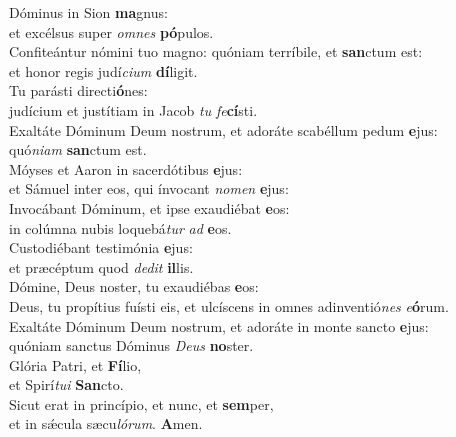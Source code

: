 \evenverse Dóminus in Sion \textbf{ma}gnus:~\*\\
\evenverse et excélsus super \textit{om}\textit{nes} \textbf{pó}pulos.\\
\oddverse Confiteántur nómini tuo magno: quóniam terríbile, et \textbf{san}ctum est:~\*\\
\oddverse et honor regis judí\textit{ci}\textit{um} \textbf{dí}ligit.\\
\evenverse Tu parásti directi\textbf{ó}nes:~\*\\
\evenverse judícium et justítiam in Jacob \textit{tu} \textit{fe}\textbf{cí}sti.\\
\oddverse Exaltáte Dóminum Deum nostrum, et adoráte scabéllum pedum \textbf{e}jus:~\*\\
\oddverse quó\textit{ni}\textit{am} \textbf{san}ctum est.\\
\evenverse Móyses et Aaron in sacerdótibus \textbf{e}jus:~\*\\
\evenverse et Sámuel inter eos, qui ínvocant \textit{no}\textit{men} \textbf{e}jus:\\
\oddverse Invocábant Dóminum, et ipse exaudiébat \textbf{e}os:~\*\\
\oddverse in colúmna nubis loquebá\textit{tur} \textit{ad} \textbf{e}os.\\
\evenverse Custodiébant testimónia \textbf{e}jus:~\*\\
\evenverse et præcéptum quod \textit{de}\textit{dit} \textbf{il}lis.\\
\oddverse Dómine, Deus noster, tu exaudiébas \textbf{e}os:~\*\\
\oddverse Deus, tu propítius fuísti eis, et ulcíscens in omnes adinventió\textit{nes} \textit{e}\textbf{ó}rum.\\
\evenverse Exaltáte Dóminum Deum nostrum, et adoráte in monte sancto \textbf{e}jus:~\*\\
\evenverse quóniam sanctus Dóminus \textit{De}\textit{us} \textbf{no}ster.\\
\oddverse Glória Patri, et \textbf{Fí}lio,~\*\\
\oddverse et Spirí\textit{tu}\textit{i} \textbf{San}cto.\\
\evenverse Sicut erat in princípio, et nunc, et \textbf{sem}per,~\*\\
\evenverse et in sǽcula sæcu\textit{ló}\textit{rum}. \textbf{A}men.\\
